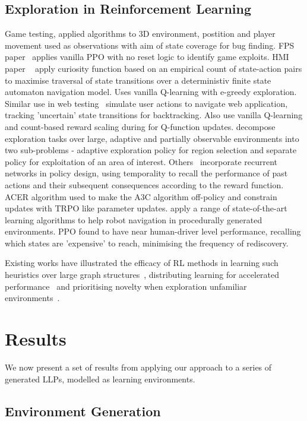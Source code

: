 \documentclass[conference,compsoc]{IEEEtran}
\begin{document}
\subsection{Exploration in Reinforcement Learning}
Game testing, applied algorithms to 3D environment, postition and player movement used as observations with aim of state coverage for bug finding. FPS paper~\cite{9231552} applies vanilla PPO with no reset logic to identify game exploits. HMI paper ~\cite{9678703} apply curiosity function based on an empirical count of state-action pairs to maximise traversal of state transitions over a deterministiv finite state automaton navigation model. Uses vanilla Q-learning with e-greedy exploration. Similar use in web testing~\cite{9402046} simulate user actions to navigate web application, tracking 'uncertain' state transitions for backtracking. Also use vanilla Q-learning and count-based reward scaling during for Q-function updates. \cite{9476756} decompose exploration tasks over large, adaptive and partially observable environments into two sub-problems - adaptive exploration policy for region selection and separate policy for exploitation of an area of interest. Others~\cite{s21041067} incorporate recurrent networks in policy design, using temporality to recall the performance of past actions and their subsequent consequences according to the reward function. ACER algorithm used to make the A3C algorithm off-policy and constrain updates with TRPO like parameter updates. \cite{electronics10222751} apply a range of state-of-the-art learning algorithms to help robot navigation in procedurally generated environments. PPO found to have near human-driver level performance, recalling which states are 'expensive' to reach, minimising the frequency of rediscovery.

Existing works have illustrated the efficacy of RL methods in learning such heuristics over large graph structures~\cite{manchanda2019learning}, distributing learning for accelerated performance~\cite{hoffman2020acme} and prioritising novelty when exploration unfamiliar environments~\cite{ostrovski2017countbased, haarnoja2018soft, gordillo2021improving}.

\section{Results}
We now present a set of results from applying our approach to a series of generated LLPs, modelled as learning environments. 
\subsection{Environment Generation}
\end{document}
